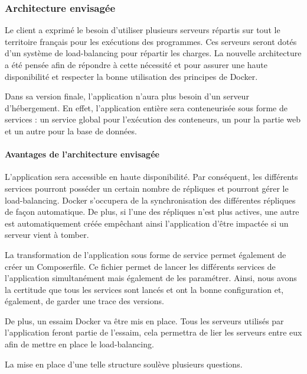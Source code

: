 \subsubsection{Architecture envisagée}

\par Le client a exprimé le besoin d'utiliser plusieurs serveurs répartis sur tout le territoire français pour les exécutions des programmes. Ces serveurs seront dotés d'un système de load-balancing pour répartir les charges.
La nouvelle architecture a été pensée afin de répondre à cette nécessité et pour assurer une haute disponibilité et respecter la bonne utilisation des principes de Docker.

\par Dans sa version finale, l’application n’aura plus besoin d’un serveur d’hébergement. En effet, l’application entière sera conteneurisée sous forme de services : un service global pour l’exécution des conteneurs, un pour la partie web et un autre pour la base de données.

\paragraph{Avantages de l'architecture envisagée}

\par L’application sera accessible en haute disponibilité. Par conséquent, les différents services pourront posséder un certain nombre de répliques et pourront gérer le load-balancing. Docker s'occupera de la synchronisation des différentes répliques de façon automatique. De plus, si l’une des répliques n’est plus actives, une autre est automatiquement créée empêchant ainsi l'application d'être impactée si un serveur vient à tomber.

\par La transformation de l’application sous forme de service permet également de créer un Composerfile. Ce fichier permet de lancer les différents services de l’application simultanément mais également de les paramétrer. Ainsi, nous avons la certitude que tous les services sont lancés et ont la bonne configuration et, également, de garder une trace des versions.

\par De plus, un essaim Docker va être mis en place. Tous les serveurs utilisés par l’application feront partie de l’essaim, cela permettra de lier les serveurs entre eux afin de mettre en place le load-balancing.

\par La mise en place d’une telle structure soulève plusieurs questions.

